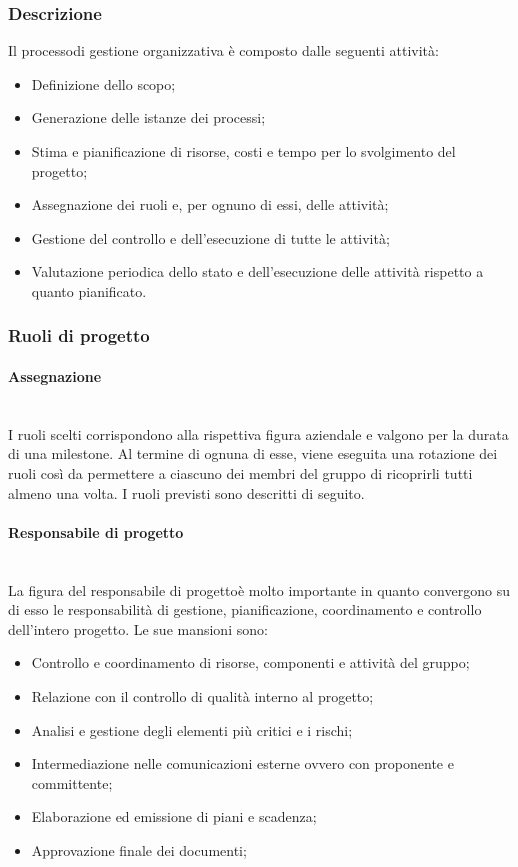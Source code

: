 		\subsubsection{Descrizione}
			Il processo\glosp di gestione organizzativa è composto dalle seguenti attività:
			\begin{itemize}
				\item Definizione dello scopo;
				\item Generazione delle istanze dei processi\glo;
				\item Stima e pianificazione di risorse, costi e tempo per lo svolgimento del progetto\glo;
				\item Assegnazione dei ruoli e, per ognuno di essi, delle attività;
				\item Gestione del controllo e dell'esecuzione di tutte le attività;
				\item Valutazione periodica dello stato e dell'esecuzione delle attività rispetto a quanto pianificato.
			\end{itemize}
		\subsubsection{Ruoli di progetto}
			\paragraph{Assegnazione}\mbox{}\\ [1mm]
				I ruoli scelti corrispondono alla rispettiva figura aziendale e valgono per la durata di una milestone. Al termine di ognuna di esse, viene eseguita una rotazione dei ruoli così da permettere a ciascuno dei membri del gruppo di ricoprirli tutti almeno una volta.
				I ruoli previsti sono descritti di seguito.
			\paragraph{Responsabile di progetto}\mbox{}\\ [1mm]
				La figura del responsabile di progetto\glosp è molto importante in quanto convergono su di esso le responsabilità di gestione, pianificazione, coordinamento e controllo dell'intero progetto\glo.
				Le sue mansioni sono:
				\begin{itemize}
					\item Controllo e coordinamento di risorse, componenti e attività del gruppo;
					\item Relazione con il controllo di qualità interno al progetto\glo;
					\item Analisi e gestione degli elementi più critici e i rischi;
					\item Intermediazione nelle comunicazioni esterne ovvero con proponente e committente;
					\item Elaborazione ed emissione di piani e scadenza;
					\item Approvazione finale dei documenti;
				\end{itemize}
